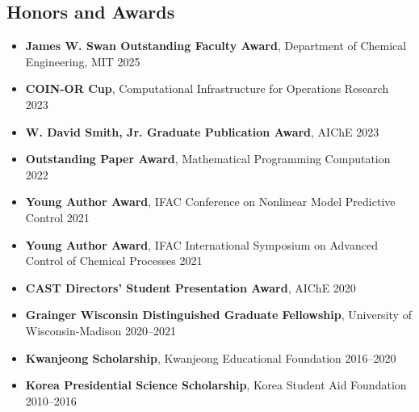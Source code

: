 \subsection*{Honors and Awards}
\begin{itemize}[leftmargin=*,itemsep=0pt]
\item[] \textbf{James W. Swan Outstanding Faculty Award}, Department of Chemical Engineering, MIT \hfill 2025
\item[] \textbf{COIN-OR Cup}, Computational Infrastructure for Operations Research \hfill 2023
\item[] \textbf{W. David Smith, Jr. Graduate Publication Award}, AIChE \hfill 2023
\item[] \textbf{Outstanding Paper Award}, Mathematical Programming Computation \hfill 2022
\item[] \textbf{Young Author Award}, IFAC Conference on Nonlinear Model Predictive Control \hfill 2021
\item[] \textbf{Young Author Award}, IFAC International Symposium on Advanced Control of Chemical Processes \hfill 2021
\item[] \textbf{CAST Directors' Student Presentation Award}, AIChE \hfill 2020
\item[] \textbf{Grainger Wisconsin Distinguished Graduate Fellowship}, University of Wisconsin-Madison \hfill 2020--2021
\item[] \textbf{Kwanjeong Scholarship}, Kwanjeong Educational Foundation \hfill 2016--2020
\item[] \textbf{Korea Presidential Science Scholarship}, Korea Student Aid Foundation \hfill 2010--2016
\end{itemize}
